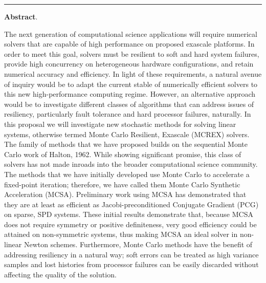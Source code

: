 
\hrule
\vskip10pt
\noindent
{\bf\large Abstract}.  

The next generation of computational science applications will require
numerical solvers that are capable of high performance on proposed exascale
platforms.  In order to meet this goal, solvers must be resilient to soft and
hard system failures, provide high concurrency on heterogeneous hardware
configurations, and retain numerical accuracy and efficiency.  In light of
these requirements, a natural avenue of inquiry would be to adapt the current
stable of numerically efficient solvers to this new high-performance computing
regime.  However, an alternative approach would be to investigate different
classes of algorithms that can address issues of resiliency, particularly
fault tolerance and hard processor failures, naturally.  In this proposal we
will investigate new stochastic methods for solving linear systems, otherwise
termed Monte Carlo Resilient, Exascale (MCREX) solvers.  The family of methods
that we have proposed builds on the sequential Monte Carlo work of Halton,
1962. While showing significant promise, this class of solvers has not made
inroads into the broader computational science community.  The methods that we
have initially developed use Monte Carlo to accelerate a fixed-point
iteration; therefore, we have called them Monte Carlo Synthetic Acceleration
(MCSA). Preliminary work using MCSA has demonstrated that they are at least as
efficient as Jacobi-preconditioned Conjugate Gradient (PCG) on sparse, SPD
systems.  These initial results demonstrate that, because MCSA does not
require symmetry or positive definiteness, very good efficiency could be
attained on non-symmetric systems, thus making MCSA an ideal solver in
non-linear Newton schemes.  Furthermore, Monte Carlo methods have the benefit
of addressing resiliency in a natural way; soft errors can be treated as high
variance samples and lost histories from processor failures can be easily
discarded without affecting the quality of the solution.
 

